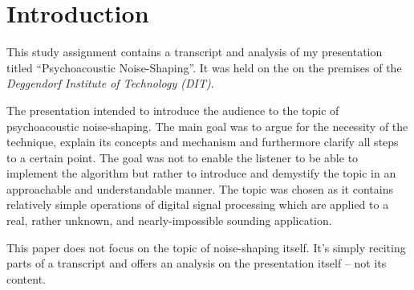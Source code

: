 \chapter{Introduction}


This study assignment contains a transcript and analysis of my presentation titled \enquote{Psychoacoustic Noise-Shaping}.
It was held on the  on the premises of the \textit{Deggendorf Institute of Technology (DIT)}.

The presentation intended to introduce the audience to the topic of psychoacoustic noise-shaping.
The main goal was to argue for the necessity of the technique, explain its concepts and mechanism and furthermore clarify all steps to a certain point.
The goal was not to enable the listener to be able to implement the algorithm but rather to introduce and demystify the topic in an approachable and understandable manner.
The topic was chosen as it contains relatively simple operations of digital signal processing which are applied to a real, rather unknown, and nearly-impossible sounding application.

This paper does not focus on the topic of noise-shaping itself.
It's simply reciting parts of a transcript and offers an analysis on the presentation itself -- not its content.
